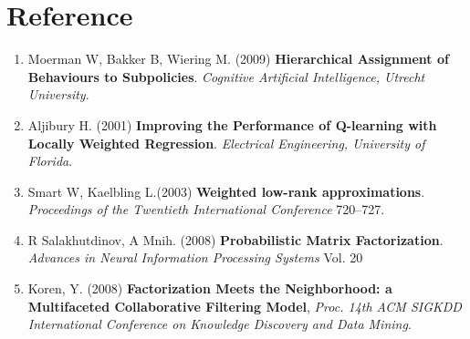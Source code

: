\documentclass[11pt]{article}
\theoremstyle{definition}
\begin{document}
\section*{\textbf{Reference}}
\begin{enumerate}
\item \label{ref:handbook}
Moerman W, Bakker B, Wiering M. (2009) \textbf{Hierarchical Assignment of Behaviours to Subpolicies}. \textit{Cognitive Artificial Intelligence, Utrecht University}. 
\item \label{ref:MFieee}
Aljibury H. (2001) \textbf{Improving the Performance of Q-learning with Locally Weighted Regression}. \textit{Electrical Engineering, University of Florida}. 
\item \label{ref:WLA}
Smart W,  Kaelbling L.(2003) \textbf{Weighted low-rank approximations}. \textit{Proceedings of the Twentieth International Conference} 720–727.
\item \label{ref:PMF}
R Salakhutdinov, A Mnih. (2008) \textbf{Probabilistic Matrix Factorization}. \textit{Advances in Neural Information Processing Systems} Vol. 20

\item \label{ref:implicit}
Koren, Y. (2008) \textbf{Factorization Meets the Neighborhood: a Multifaceted Collaborative Filtering Model}, \textit{Proc. 14th ACM SIGKDD International Conference on Knowledge Discovery and
Data Mining}.

\end{enumerate}
\end{document}

